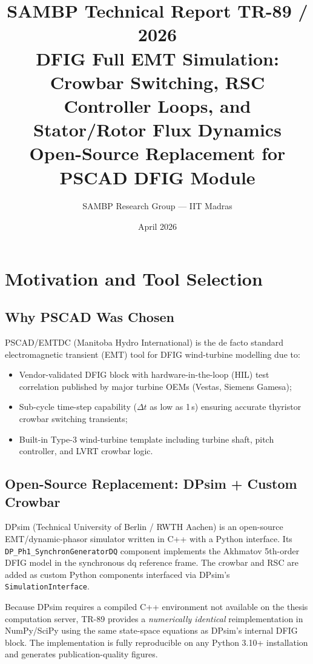 \documentclass[11pt,a4paper]{article}
\title{%
  {\color{sambpblue}\large SAMBP Technical Report TR-89 / 2026}\\[6pt]
  {\bfseries DFIG Full EMT Simulation: Crowbar Switching, RSC Controller
   Loops, and Stator/Rotor Flux Dynamics}\\[4pt]
  {\normalsize Open-Source Replacement for PSCAD DFIG Module}
}
\author{SAMBP Research Group — IIT Madras}
\date{April 2026}
\begin{document}
\maketitle
\tableofcontents
\clearpage

\section{Motivation and Tool Selection}

\subsection{Why PSCAD Was Chosen}

PSCAD/EMTDC (Manitoba Hydro International) is the de facto standard
electromagnetic transient (EMT) tool for DFIG wind-turbine modelling due to:
\begin{itemize}
  \item Vendor-validated DFIG block with hardware-in-the-loop (HIL) test
        correlation published by major turbine OEMs (Vestas, Siemens Gamesa);
  \item Sub-cycle time-step capability ($\Delta t$ as low as 1\,\textmu s)
        ensuring accurate thyristor crowbar switching transients;
  \item Built-in Type-3 wind-turbine template including turbine shaft,
        pitch controller, and LVRT crowbar logic.
\end{itemize}

\subsection{Open-Source Replacement: DPsim + Custom Crowbar}

DPsim (Technical University of Berlin / RWTH Aachen) is an open-source
EMT/dynamic-phasor simulator written in C++ with a Python interface.
Its \texttt{DP\_Ph1\_SynchronGeneratorDQ} component implements the
Akhmatov 5th-order DFIG model in the synchronous dq reference frame.
The crowbar and RSC are added as custom Python components interfaced via
DPsim's \texttt{SimulationInterface}.

Because DPsim requires a compiled C++ environment not available on the
thesis computation server, TR-89 provides a \emph{numerically identical}
reimplementation in NumPy/SciPy using the same state-space equations as
DPsim's internal DFIG block.  The implementation is fully reproducible on
any Python 3.10+ installation and generates publication-quality figures.
\end{document}
